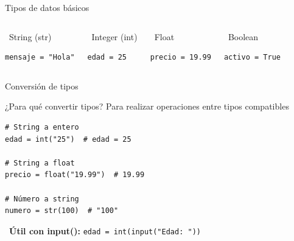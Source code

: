 \documentclass{beamer}
\begin{document}
\begin{frame}[fragile]{Tipos de datos básicos \ \faCubes}

\begin{columns}[T]
\begin{conceptbox}{\faFont \ String (str)}
\vspace{-0.15cm}
\begin{lstlisting}
mensaje = "Hola"
\end{lstlisting}
\end{conceptbox}

\vspace{0.1cm}
\begin{conceptbox}{\faHashtag \ Integer (int)}
\vspace{-0.15cm}
\begin{lstlisting}
edad = 25
\end{lstlisting}
\end{conceptbox}

\begin{conceptbox}{\faCalculator \ Float}
\vspace{-0.15cm}
\begin{lstlisting}
precio = 19.99
\end{lstlisting}
\end{conceptbox}

\vspace{0.1cm}
\begin{conceptbox}{\faToggleOn \ Boolean}
\vspace{-0.15cm}
\begin{lstlisting}
activo = True
\end{lstlisting}
\end{conceptbox}
\end{columns}
\end{frame}

\begin{frame}[fragile]{Conversión de tipos \ \faExchangeAlt}

\begin{conceptbox}{¿Para qué convertir tipos?}
Para realizar operaciones entre tipos compatibles
\end{conceptbox}

\vspace{-0.2cm}
\begin{lstlisting}
# String a entero
edad = int("25")  # edad = 25

# String a float
precio = float("19.99")  # 19.99

# Número a string
numero = str(100)  # "100"
\end{lstlisting}

\vspace{-0.1cm}
\begin{notebox}
\small\faLightbulb \ \textbf{Útil con input():} \texttt{edad = int(input("Edad: "))}
\end{notebox}
\end{frame}
\end{document}
